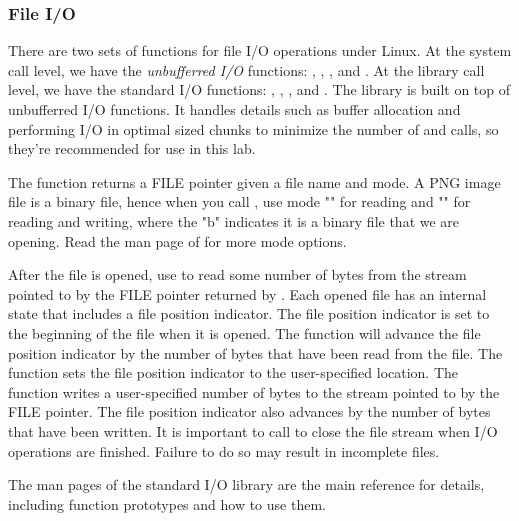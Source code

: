 \subsubsection{File I/O}
There are two sets of functions for file I/O operations under Linux. At the system call level, we have the {\em unbufferred I/O} functions: , , ,  and . At the library call level, we have the standard I/O functions: , , ,  and . The library is built on top of unbufferred I/O functions. It handles details such as buffer allocation and performing I/O in optimal sized chunks to minimize the number of  and  calls, so they're recommended for use in this lab.

The  function returns a FILE pointer given a file name and mode. A PNG image file is a binary file, hence when you call , use mode "" for reading and "" for reading and writing, where the "b" indicates it is a binary file that we are opening. Read the man page of  for more mode options. 

After the file is opened, use  to read some number of bytes from the stream pointed to by the FILE pointer returned by . Each opened file has an internal state that includes a file position indicator. The file position indicator is set to the beginning of the file when it is opened. The  function will advance the file position indicator by the number of bytes that have been read from the file. The  function sets the file position indicator to the user-specified location. The  function writes a user-specified number of bytes to the stream pointed to by the FILE pointer. The file position indicator also advances by the number of bytes that have been written. It is important to call  to close the file stream when I/O operations are finished. Failure to do so may result in incomplete files.  

The man pages of the standard I/O library are the main reference for details, including function prototypes and how to use them.   

